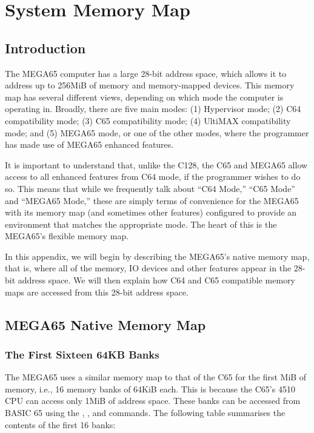 \chapter{System Memory Map}
\label{cha:memory-map}
\section{Introduction}

The MEGA65 computer has a large 28-bit address space, which allows it
to address up to 256MiB of memory and memory-mapped devices.
This memory map has several different views, depending on which mode
the computer is operating in. Broadly, there are five main modes:
(1) Hypervisor mode; (2) C64 compatibility mode; (3) C65 compatibility mode; (4) UltiMAX
compatibility mode; and (5) MEGA65 mode, or one of the other modes,
where the programmer has made use of MEGA65 enhanced features.

It is important to understand that, unlike the C128, the C65 and
MEGA65 allow access to all enhanced features from C64 mode, if the
programmer wishes to do so.  This means that while we frequently talk
about ``C64 Mode,'' ``C65 Mode'' and ``MEGA65 Mode,'' these are simply
terms of convenience for the MEGA65 with its memory map (and sometimes
other features) configured to provide an environment that matches
the appropriate mode.  The heart of this is the MEGA65's flexible
memory map.

In this appendix, we will begin by describing the MEGA65's native
memory map, that is, where all of the memory, IO devices and other
features appear in the 28-bit address space. We will then explain how
C64 and C65 compatible memory maps are accessed from this 28-bit
address space.

\newpage

\section{MEGA65 Native Memory Map}

\subsection{The First Sixteen 64KB Banks}

The MEGA65 uses a similar memory map to that of the C65 for the first
MiB of memory, i.e., 16 memory banks of 64KiB each.
This is because the C65's 4510 CPU can access only 1MiB
of address space.  These banks can be accessed from BASIC 65 using the
,
,  and 
commands.  The following table summarises the contents of the first
16 banks:


